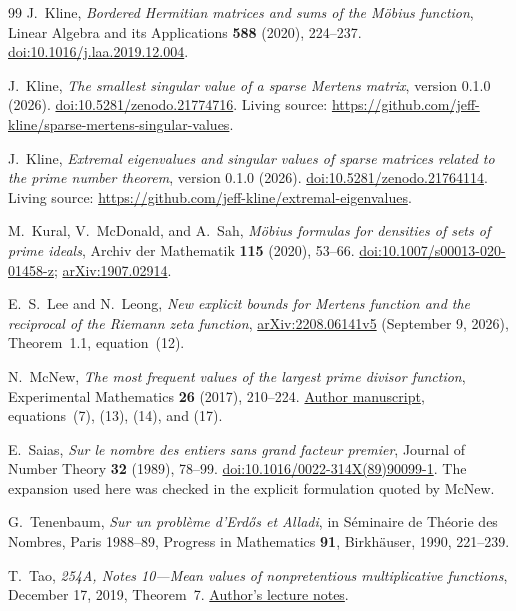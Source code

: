 \begin{thebibliography}{99}
J.~Kline, \emph{Bordered Hermitian matrices and sums of the M\"obius function},
Linear Algebra and its Applications \textbf{588} (2020), 224--237.
\href{https://doi.org/10.1016/j.laa.2019.12.004}{doi:10.1016/j.laa.2019.12.004}.

J.~Kline, \emph{The smallest singular value of a sparse Mertens matrix},
version 0.1.0 (2026).
\href{https://doi.org/10.5281/zenodo.21774716}{doi:10.5281/zenodo.21774716}.
Living source: \url{https://github.com/jeff-kline/sparse-mertens-singular-values}.

J.~Kline, \emph{Extremal eigenvalues and singular values of sparse matrices related to the prime number theorem},
version 0.1.0 (2026).
\href{https://doi.org/10.5281/zenodo.21764114}{doi:10.5281/zenodo.21764114}.
Living source: \url{https://github.com/jeff-kline/extremal-eigenvalues}.

M.~Kural, V.~McDonald, and A.~Sah,
\emph{M\"obius formulas for densities of sets of prime ideals},
Archiv der Mathematik \textbf{115} (2020), 53--66.
\href{https://doi.org/10.1007/s00013-020-01458-z}{doi:10.1007/s00013-020-01458-z};
\href{https://arxiv.org/abs/1907.02914}{arXiv:1907.02914}.

E.~S.~Lee and N.~Leong,
\emph{New explicit bounds for Mertens function and the reciprocal of the Riemann zeta function},
\href{https://arxiv.org/html/2208.06141v5}{arXiv:2208.06141v5} (September 9, 2026),
Theorem~1.1, equation~(12).

N.~McNew, \emph{The most frequent values of the largest prime divisor function},
Experimental Mathematics \textbf{26} (2017), 210--224.
\href{https://www.nathanmcnew.com/PopularPrimes.pdf}{Author manuscript},
equations~(7), (13), (14), and (17).

E.~Saias, \emph{Sur le nombre des entiers sans grand facteur premier},
Journal of Number Theory \textbf{32} (1989), 78--99.
\href{https://doi.org/10.1016/0022-314X(89)90099-1}{doi:10.1016/0022-314X(89)90099-1}.
The expansion used here was checked in the explicit formulation quoted by McNew.

G.~Tenenbaum, \emph{Sur un probl\`eme d'Erd\H{o}s et Alladi},
in S\'eminaire de Th\'eorie des Nombres, Paris 1988--89, Progress in Mathematics \textbf{91},
Birkh\"auser, 1990, 221--239.

T.~Tao, \emph{254A, Notes 10---Mean values of nonpretentious multiplicative functions},
December 17, 2019, Theorem~7.
\href{https://terrytao.wordpress.com/2019/12/17/254a-notes-10-mean-values-of-nonpretentious-multiplicative-functions/}{Author's lecture notes}.

\end{thebibliography}
